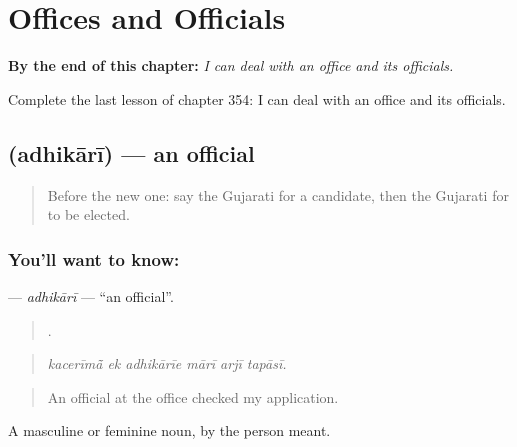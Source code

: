 
\chapter{Offices and Officials}
\label{ch:gu-offices-and-officials}

\begin{chapteropening}
\textbf{By the end of this chapter:} \emph{I can deal with an office and its officials.}

Complete the last lesson of chapter 354: I can deal with an office and its officials.
\end{chapteropening}

\section[\texorpdfstring{\gu{અધિકારી} (adhikārī)}{અધિકારી (adhikārī)}]{ (adhikārī) — an official}

\label{lesson:GU-C354-adhikari}



\begin{quote}
Before the new one: say the Gujarati for a candidate, then the Gujarati for to be elected.
\end{quote}

\subsection*{You'll want to know: }
\textbf{} — \emph{adhikārī} — \textquotedblleft{}an official\textquotedblright{}.

\begin{quote}
     .
\end{quote}

\begin{quote}
\emph{kacerīmā̃ ek adhikārīe mārī arjī tapāsī.}
\end{quote}

\begin{quote}
An official at the office checked my application.
\end{quote}

A masculine or feminine noun, by the person meant.


